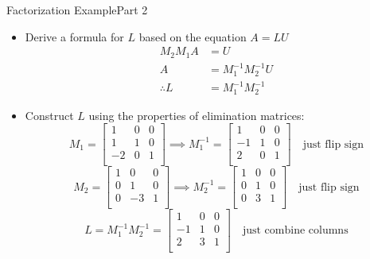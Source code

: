 \documentclass[10pt]{beamer}
\begin{document}
\begin{frame}{Factorization Example}{Part 2}

\begin{itemize}

\item[3.] Derive a formula for $L$ based on the equation $A=LU$
\begin{align*}
    M_2 M_1 A &= U\\
    A &= M_1^{-1} M_2^{-1} U\\ 
      \therefore L &= M_1^{-1} M_2^{-1}
\end{align*}

\item[4.] Construct $L$ using the properties of elimination matrices:
$$
M_1 = \begin{bmatrix}
1 & 0 & 0\\
1 & 1 & 0\\
-2 & 0 & 1\\
\end{bmatrix} \implies 
M_1^{-1} = \begin{bmatrix}
1 & 0 & 0\\
-1 & 1 & 0\\
2 & 0 & 1\\
\end{bmatrix}\quad\text{just flip sign}
$$
$$
M_2 = \begin{bmatrix}
1 & 0 & 0\\
0 & 1 & 0\\
0 & -3 & 1\\
\end{bmatrix} \implies 
M_2^{-1} = \begin{bmatrix}
1 & 0 & 0\\
0 & 1 & 0\\
0 & 3 & 1\\
\end{bmatrix} \quad\text{just flip sign}
$$
$$
L = M_1^{-1}M_2^{-1}= \begin{bmatrix}
1 & 0 & 0\\
-1 & 1 & 0\\
2 & 3 & 1\\
\end{bmatrix} \quad\text{just combine columns}
$$
\end{itemize}
\end{frame}
\end{document}
